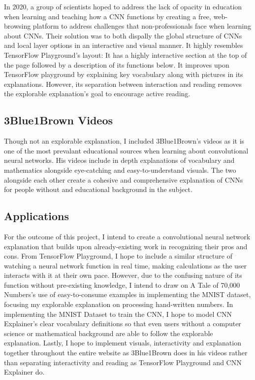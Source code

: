 \documentclass[10pt,twocolumn]{article}
\begin{document}
In 2020, a group of scientists hoped to address the lack of opacity in education when learning and teaching how a CNN functions by creating a free, web-browsing platform to address challenges that non-professionals face when learning about CNNs. Their solution was to both dispally the global structure of CNNs and local layer options in an interactive and visual manner. It highly resembles TensorFlow Playground's layout: It has a highly interactive section at the top of the page followed by a description of its functions below. It improves upon TensorFlow playground by explaining key vocabulary along with pictures in its explanations. However, its separation between interaction and reading removes the explorable explanation's goal to encourage active reading. \cite{cnnExplorable}

\subsection{3Blue1Brown Videos}
Though not an explorable explanation, I included 3Blue1Brown's videos as it is one of the most prevalant educational sources when learning about convolutional neural networks. His videos include in depth explanations of vocabulary and mathematics alongside eye-catching and easy-to-understand visuals. The two alongside each other create a cohesive and comprehensive explanation of CNNs for people without and educational background in the subject. \cite{3Blue1Brown}

\subsection{Applications}
For the outcome of this project, I intend to create a convolutional neural network explanation that builds upon already-existing work in recognizing their pros and cons. From TensorFlow Playground, I hope to include a similar structure of watching a neural network function in real time, making calculations as the user interacts with it at their own pace. However, due to the confusing nature of its function without pre-existing knowledge, I intend to draw on A Tale of 70,000 Numbers's use of easy-to-consume examples in implementing the MNIST dataset, focusing my explorable explanation on processing hand-written numbers. \cite{ExplorableExplanation} In implementing the MNIST Dataset to train the CNN, I hope to model CNN Explainer's clear vocabulary definitions so that even users without a computer science or mathematical background are able to follow the explorable explanation. \cite{cnnExplorable} Lastly, I hope to implement visuals, interactivity and explanation together throughout the entire website as 3Blue1Brown does in his videos rather than separating interactivity and reading as TensorFlow Playground and CNN Explainer do. \cite{3Blue1Brown}
\end{document}
